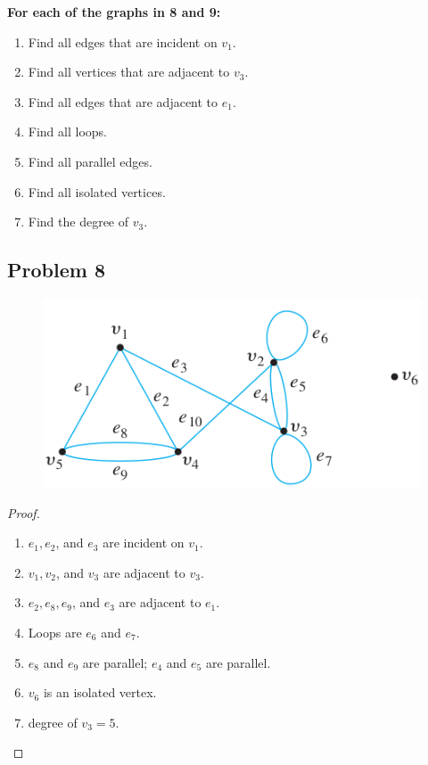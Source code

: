 \documentclass[14pt]{extarticle}
\begin{document}
{\bf For each of the graphs in 8 and 9:}
\begin{enumerate}
\item Find all edges that are incident on $v_1$.
\item Find all vertices that are adjacent to $v_3$.
\item Find all edges that are adjacent to $e_1$.
\item Find all loops.
\item Find all parallel edges.
\item Find all isolated vertices.
\item Find the degree of $v_3$.
\end{enumerate}

\subsection{Problem 8}

\begin{figure}[ht!]
\centering
\includegraphics[scale=0.5]{../images/1.4.8.png}
\end{figure}

\begin{proof}
\begin{enumerate}
\item $e_1, e_2$, and $e_3$ are incident on $v_1$.
\item $v_1, v_2$, and $v_3$ are adjacent to $v_3$.
\item $e_2, e_8, e_9$, and $e_3$ are adjacent to $e_1$.
\item Loops are $e_6$ and $e_7$.
\item $e_8$ and $e_9$ are parallel; $e_4$ and $e_5$ are parallel.
\item $v_6$ is an isolated vertex.
\item degree of $v_3 = 5$.
\end{enumerate}
\end{proof}
\end{document}
